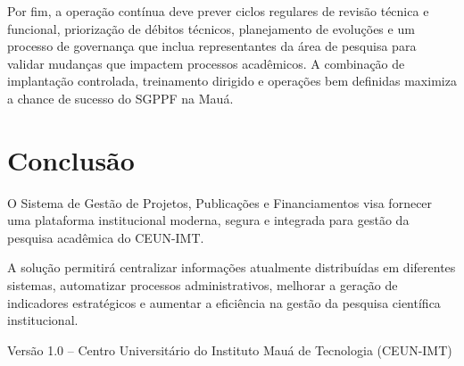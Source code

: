 \documentclass[12pt,a4paper]{article}
\begin{document}
Por fim, a operação contínua deve prever ciclos regulares de revisão técnica e funcional, priorização de débitos técnicos, planejamento de evoluções e um processo de governança que inclua representantes da área de pesquisa para validar mudanças que impactem processos acadêmicos. A combinação de implantação controlada, treinamento dirigido e operações bem definidas maximiza a chance de sucesso do SGPPF na Mauá.

\section{Conclusão}
O Sistema de Gestão de Projetos, Publicações e Financiamentos visa fornecer uma plataforma institucional moderna, segura e integrada para gestão da pesquisa acadêmica do CEUN-IMT.

A solução permitirá centralizar informações atualmente distribuídas em diferentes sistemas, automatizar processos administrativos, melhorar a geração de indicadores estratégicos e aumentar a eficiência na gestão da pesquisa científica institucional.

\vfill
\noindent Versão 1.0 -- Centro Universitário do Instituto Mauá de Tecnologia (CEUN-IMT)
\end{document}
